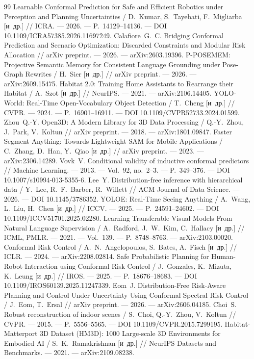 \documentclass[conference,a4paper]{IEEEtran}
\theoremstyle{definition}
\begin{document}
\begin{thebibliography}{99}
 Learnable Conformal Prediction for Safe and Efficient Robotics under Perception and Planning Uncertainties / D.~Kumar, S.~Tayebati, F.~Migliarba [и~др.] // ICRA. --- 2026. --- P.~14129--14136. --- DOI 10.1109/ICRA57385.2026.11697249.
 Calafiore~G.~C. Bridging Conformal Prediction and Scenario Optimization: Discarded Constraints and Modular Risk Allocation // arXiv preprint. --- 2026. --- arXiv:2603.19396.
 P-POSEMEM: Projective Semantic Memory for Consistent Language Grounding under Pose-Graph Rewrites / H.~Sier [и~др.] // arXiv preprint. --- 2026. --- arXiv:2609.15475.
 Habitat 2.0: Training Home Assistants to Rearrange their Habitat / A.~Szot [и~др.] // NeurIPS. --- 2021. --- arXiv:2106.14405.
 YOLO-World: Real-Time Open-Vocabulary Object Detection / T.~Cheng [и~др.] // CVPR. --- 2024. --- P.~16901--16911. --- DOI 10.1109/CVPR52733.2024.01599.
 Zhou~Q.-Y. Open3D: A Modern Library for 3D Data Processing / Q.-Y.~Zhou, J.~Park, V.~Koltun // arXiv preprint. --- 2018. --- arXiv:1801.09847.
 Faster Segment Anything: Towards Lightweight SAM for Mobile Applications / C.~Zhang, D.~Han, Y.~Qiao [и~др.] // arXiv preprint. --- 2023. --- arXiv:2306.14289.
 Vovk~V. Conditional validity of inductive conformal predictors // Machine Learning. --- 2013. --- Vol.~92, no.~2--3. --- P.~349--376. --- DOI 10.1007/s10994-013-5355-6.
 Lee~Y. Distribution-free inference with hierarchical data / Y.~Lee, R.~F.~Barber, R.~Willett // ACM Journal of Data Science. --- 2026. --- DOI 10.1145/3786352.
 YOLOE: Real-Time Seeing Anything / A.~Wang, L.~Liu, H.~Chen [и~др.] // ICCV. --- 2025. --- P.~24591--24602. --- DOI 10.1109/ICCV51701.2025.02280.
 Learning Transferable Visual Models From Natural Language Supervision / A.~Radford, J.~W.~Kim, C.~Hallacy [и~др.] // ICML, PMLR. --- 2021. --- Vol.~139. --- P.~8748--8763. --- arXiv:2103.00020.
 Conformal Risk Control / A.~N.~Angelopoulos, S.~Bates, A.~Fisch [и~др.] // ICLR. --- 2024. --- arXiv:2208.02814.
 Safe Probabilistic Planning for Human-Robot Interaction using Conformal Risk Control / J.~Gonzales, K.~Mizuta, K.~Leung [и~др.] // IROS. --- 2025. --- P.~18676--18683. --- DOI 10.1109/IROS60139.2025.11247339.
 Eom~J. Distribution-Free Risk-Aware Planning and Control Under Uncertainty Using Conformal Spectral Risk Control / J.~Eom, T.~Ersal // arXiv preprint. --- 2026. --- arXiv:2606.04185.
 Choi~S. Robust reconstruction of indoor scenes / S.~Choi, Q.-Y.~Zhou, V.~Koltun // CVPR. --- 2015. --- P.~5556--5565. --- DOI 10.1109/CVPR.2015.7299195.
 Habitat-Matterport 3D Dataset (HM3D): 1000 Large-scale 3D Environments for Embodied AI / S.~K.~Ramakrishnan [и~др.] // NeurIPS Datasets and Benchmarks. --- 2021. --- arXiv:2109.08238.
\end{thebibliography}
\end{document}
